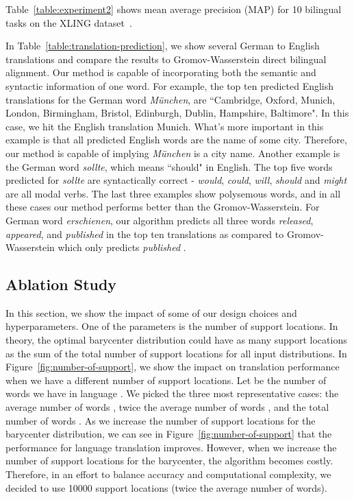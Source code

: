 \documentclass{article}
\begin{document}
Table~\ref{table:experiment2} shows mean average precision (MAP) for 10 bilingual tasks on the XLING dataset~\cite{glavas-etal-2019-properly}.

 In Table~\ref{table:translation-prediction}, we show several German to English translations and compare the results to Gromov-Wasserstein direct bilingual alignment. Our method is capable of incorporating both the semantic and syntactic information of one word.
For example, the top ten predicted English translations for the German word \textit{München}, are ``Cambridge, Oxford, Munich, London, Birmingham, Bristol, Edinburgh, Dublin, Hampshire, Baltimore". In this case, we hit the English translation Munich. What's more important in this example is that all predicted English words are the name of some city. Therefore, our method is capable of implying \textit{München} is a city name.
Another example is the German word \textit{sollte}, which means ``should" in English.
The top five words predicted for \textit{sollte} are syntactically correct - \textit{would}, \textit{could}, \textit{will}, \textit{should} and \textit{might} are all modal verbs. 
The last three examples show polysemous words, and in all these cases our method performs better than the Gromov-Wasserstein. For German word \textit{erschienen}, our algorithm predicts all three words {\it released}, {\it appeared}, and {\it published} in the top ten translations as compared to Gromov-Wasserstein which only predicts {\it published }. 



\subsection{Ablation Study} In this section, we show the impact of some of our design choices and hyperparameters.
One of the parameters is the number of support locations. In theory, the optimal barycenter distribution could have as many support locations as the sum of the total number of support locations for all input distributions.
In Figure~\ref{fig:number-of-support}, we show the impact on translation performance when we have a different number of support locations. Let  be the number of words we have in language .
We picked the three most representative cases: the average number of words , twice the average number of words , and the total number of words .
As we increase the number of support locations for the barycenter distribution, we can see in Figure~\ref{fig:number-of-support} that the performance for language translation improves. However, when we increase the number of support locations for the barycenter, the algorithm becomes costly.
Therefore, in an effort to balance accuracy and computational complexity, we decided to use 10000 support locations (twice the average number of words). 
\end{document}
